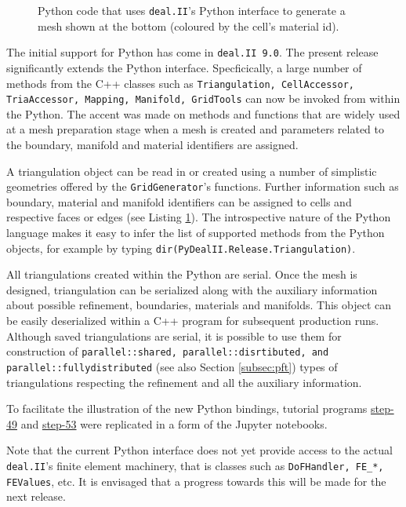 \documentclass{ansarticle-preprint}
\begin{document}
\begin{figure}
\caption{Python code that uses \texttt{deal.II}'s Python interface to generate a mesh shown at the bottom (coloured by the cell's material id).}
\label{python_wrapper}
\end{figure}


The initial support for Python has come in \texttt{deal.II 9.0}. The present release significantly extends the Python interface. Specficically, a large number of methods from the C++ classes such as \texttt{Triangulation, CellAccessor, TriaAccessor, Mapping, Manifold, GridTools} can now be invoked from within the Python. The accent was made on methods and functions that are widely used at a mesh preparation stage when a mesh is created and parameters related to the boundary, manifold and material identifiers are assigned.

A triangulation object can be read in or created using a number of simplistic geometries offered by the \texttt{GridGenerator}'s functions. Further information such as boundary, material and manifold identifiers can be assigned to cells and respective faces or edges (see Listing \ref{python_wrapper}). The introspective nature of the Python language makes it easy to infer the list of supported methods from the Python objects, for example by typing \texttt{dir(PyDealII.Release.Triangulation)}.

All triangulations created within the Python are serial. Once the mesh is designed, triangulation can be serialized along with the auxiliary information about possible refinement, boundaries, materials and manifolds. This object can be easily deserialized within a C++ program for subsequent production runs. Although saved triangulations are serial, it is possible to use them for construction of \texttt{parallel::shared, parallel::disrtibuted, and parallel::fullydistributed} (see also Section \ref{subsec:pft}) types of triangulations respecting the refinement and all the auxiliary information.

To facilitate the illustration of the new Python bindings, tutorial programs \href{https://github.com/dealii/dealii/blob/dealii-9.2/examples/step-49/step-49.ipynb}{step-49} and \href{https://github.com/dealii/dealii/blob/dealii-9.2/examples/step-53/step-53.ipynb}{step-53} were replicated in a form of the Jupyter notebooks.

Note that the current Python interface does not yet provide access to the actual \texttt{deal.II}'s finite element machinery, that is classes such as \texttt{DoFHandler, FE\_*, FEValues}, etc. It is envisaged that a progress towards this will be made for the next release.
\end{document}
